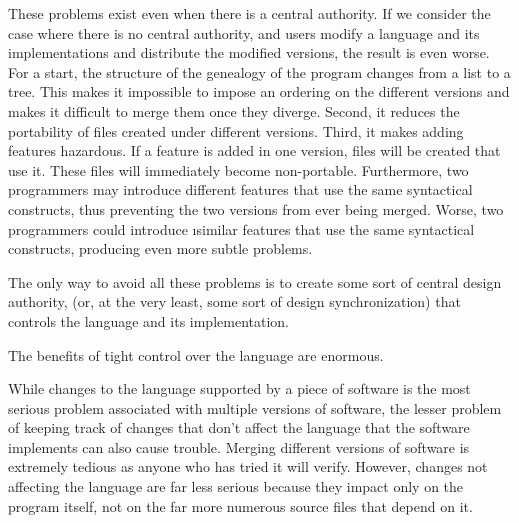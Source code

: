 These problems exist even when there is a central authority.
If we consider the case where there is no central authority, and
users modify a language and its implementations and distribute the
modified versions, the result is even worse. For a start, the
structure of the genealogy of the program
changes from a list to a tree.
This makes it impossible to impose an ordering on the different versions
and makes it difficult to merge them once they diverge. Second, it
reduces the portability of files created under different versions.
Third, it makes adding features hazardous. If a feature is added in
one version, files will be created that use it. These files will
immediately become non-portable. Furthermore, two programmers may
introduce different features that use the same syntactical constructs,
thus preventing the two versions from ever being merged. Worse, two
programmers could introduce \i{similar} features that use the
same syntactical constructs, producing even more subtle problems.

The only way to avoid all these problems is to create some sort of
central design authority,
(or, at the very least, some sort of design
synchronization) that controls the language and its implementation.

The benefits of tight control over the language are enormous.



While changes to the language supported by a piece of software is the
most serious problem associated with multiple versions of software,
the lesser problem of keeping track of changes that don't affect the
language that the software implements can also cause trouble. Merging
different versions of software is extremely tedious as anyone who
has tried it will verify. However, changes not affecting the
language are far less serious because they impact only on the program
itself, not on the far more numerous source files that depend on it.

